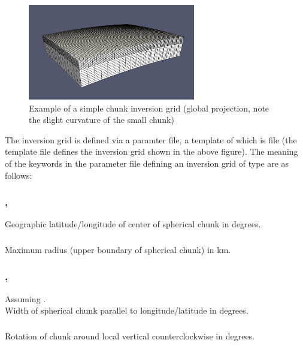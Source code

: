 \begin{figure}[ht]
  \centering
  \includegraphics[width=0.65\textwidth]{images/schunkInversionGrid_manual.png}
  \caption{Example of a simple chunk inversion grid (global projection, note the slight curvature of the small chunk)}
  \label{basic_steps,sec:invgrid,sub:schunk,fig:grid}
\end{figure}

The inversion grid is defined via a paramter file, a template of which is file 
 (the template file defines the inversion grid
shown in the above figure).
The meaning of the keywords in the parameter file defining an inversion grid of type 
are as follows:

\subsubsection{,} %
Geographic latitude/longitude of center of spherical chunk in degrees.
\subsubsection{}
Maximum radius (upper boundary of spherical chunk) in km.
\subsubsection{, }
Assuming .\\
Width of spherical chunk parallel to longitude/latitude in degrees.
\subsubsection{}
Rotation of chunk around local vertical counterclockwise in degrees.
